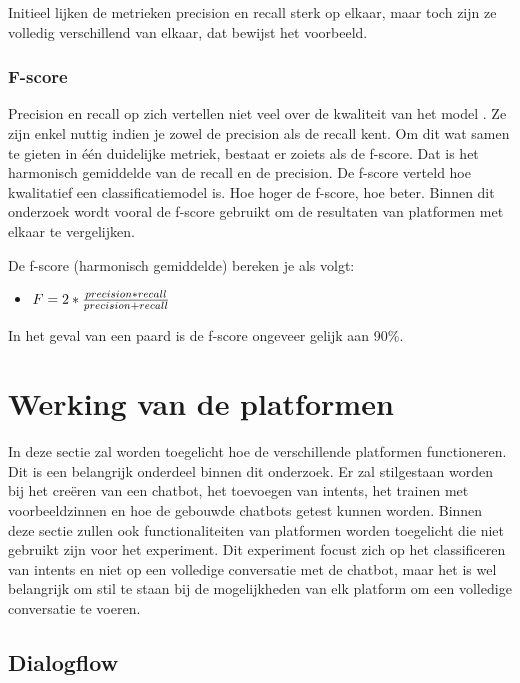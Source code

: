 Initieel lijken de metrieken precision en recall sterk op elkaar, maar toch zijn ze volledig verschillend van elkaar, dat bewijst het voorbeeld.

\subsubsection{F-score}

Precision en recall op zich vertellen niet veel over de kwaliteit van het model \autocite{Treml2019}. Ze zijn enkel nuttig indien je zowel de precision als de recall kent. Om dit wat samen te gieten in één duidelijke metriek, bestaat er zoiets als de f-score. Dat is het harmonisch gemiddelde van de recall en de precision. De f-score verteld hoe kwalitatief een classificatiemodel is. Hoe hoger de f-score, hoe beter. Binnen dit onderzoek wordt vooral de f-score gebruikt om de resultaten van platformen met elkaar te vergelijken.

De f-score (harmonisch gemiddelde) bereken je als volgt:
\begin{itemize}
    \item $F= 2 * \frac{precision*recall}{precision+recall}\\$
\end{itemize}

In het geval van een paard is de f-score ongeveer gelijk aan 90\%.


\section{Werking van de platformen}
\label{sec:werking-platformen}


In deze sectie zal worden toegelicht hoe de verschillende platformen functioneren. Dit is een belangrijk onderdeel binnen dit onderzoek. Er zal stilgestaan worden bij het creëren van een chatbot, het toevoegen van intents, het trainen met voorbeeldzinnen en hoe de gebouwde chatbots getest kunnen worden. Binnen deze sectie zullen ook functionaliteiten van platformen worden toegelicht die niet gebruikt zijn voor het experiment. Dit experiment focust zich op het classificeren van intents en niet op een volledige conversatie met de chatbot, maar het is wel belangrijk om stil te staan bij de mogelijkheden van elk platform om een volledige conversatie te voeren.

\subsection{Dialogflow}
\label{subsec:werking-platformen-dialogflow}

